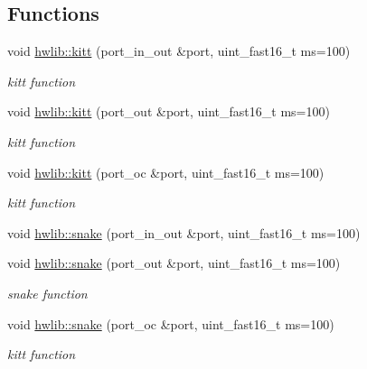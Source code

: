 \subsection*{Functions}
\begin{DoxyCompactItemize}
\item 
void \hyperlink{namespacehwlib_aaabcbce6ceaee099d8b63d7ced145cea}{hwlib\+::kitt} (port\+\_\+in\+\_\+out \&port, uint\+\_\+fast16\+\_\+t ms=100)
\begin{DoxyCompactList}\small\item\em kitt function \end{DoxyCompactList}\item 
void \hyperlink{namespacehwlib_a0e6f0ad32ff93519562a880047f3fc2e}{hwlib\+::kitt} (port\+\_\+out \&port, uint\+\_\+fast16\+\_\+t ms=100)
\begin{DoxyCompactList}\small\item\em kitt function \end{DoxyCompactList}\item 
void \hyperlink{namespacehwlib_a2f86682625c78a7c595bac456ed81b5c}{hwlib\+::kitt} (port\+\_\+oc \&port, uint\+\_\+fast16\+\_\+t ms=100)
\begin{DoxyCompactList}\small\item\em kitt function \end{DoxyCompactList}\item 
void \hyperlink{namespacehwlib_afec6df9d280b36f3c7f43ffb607edd92}{hwlib\+::snake} (port\+\_\+in\+\_\+out \&port, uint\+\_\+fast16\+\_\+t ms=100)
\item 
void \hyperlink{namespacehwlib_ade8d1e7034d2491a2180116619ec4fbe}{hwlib\+::snake} (port\+\_\+out \&port, uint\+\_\+fast16\+\_\+t ms=100)
\begin{DoxyCompactList}\small\item\em snake function \end{DoxyCompactList}\item 
void \hyperlink{namespacehwlib_a7e2fef74b1e48c7ae225d7b2a7b2935f}{hwlib\+::snake} (port\+\_\+oc \&port, uint\+\_\+fast16\+\_\+t ms=100)
\begin{DoxyCompactList}\small\item\em kitt function \end{DoxyCompactList}\end{DoxyCompactItemize}
